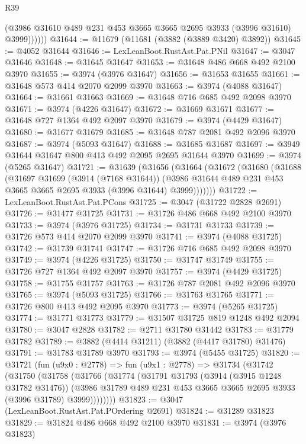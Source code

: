 \begin{lexlean}{R39}
\begin{coremodule}
              (@3986 @31610 @489 @231 @453 @3665 @3665 @2695 @3933 (@3996 @31610) @3999))))))
@31644 := @11679 (@11681 (@3882 (@3889 @3420) @3892))
@31645 := @4052 @31644
@31646 := LexLeanBoot.RustAst.Pat.PNil
@31647 := @3047 @31646
@31648 := @31645 @31647
@31653 := @31648 @486 @668 @492 @2100 @3970
@31655 := @3974 (@3976 @31647)
@31656 := @31653 @31655
@31661 := @31648 @573 @414 @2070 @2099 @3970
@31663 := @3974 (@4088 @31647)
@31664 := @31661 @31663
@31669 := @31648 @716 @685 @492 @2098 @3970
@31671 := @3974 (@4226 @31647)
@31672 := @31669 @31671
@31677 := @31648 @727 @1364 @492 @2097 @3970
@31679 := @3974 (@4429 @31647)
@31680 := @31677 @31679
@31685 := @31648 @787 @2081 @492 @2096 @3970
@31687 := @3974 (@5093 @31647)
@31688 := @31685 @31687
@31697 := @3949 @31644 @31647 @800 @413 @492 @2095 @2695 @31644 @3970
@31699 := @3974 (@5265 @31647)
@31721 := @31639
    (@31656
      (@31664
        (@31672
          (@31680
            (@31688
              (@31697
                @31699
                (@3914 (@7168 @31644))
                (@3986 @31644 @489 @231 @453 @3665 @3665 @2695 @3933 (@3996 @31644) @3999)))))))
@31722 := LexLeanBoot.RustAst.Pat.PCons
@31725 := @3047 (@31722 @2828 @2691)
@31726 := @31477 @31725
@31731 := @31726 @486 @668 @492 @2100 @3970
@31733 := @3974 (@3976 @31725)
@31734 := @31731 @31733
@31739 := @31726 @573 @414 @2070 @2099 @3970
@31741 := @3974 (@4088 @31725)
@31742 := @31739 @31741
@31747 := @31726 @716 @685 @492 @2098 @3970
@31749 := @3974 (@4226 @31725)
@31750 := @31747 @31749
@31755 := @31726 @727 @1364 @492 @2097 @3970
@31757 := @3974 (@4429 @31725)
@31758 := @31755 @31757
@31763 := @31726 @787 @2081 @492 @2096 @3970
@31765 := @3974 (@5093 @31725)
@31766 := @31763 @31765
@31771 := @31726 @800 @413 @492 @2095 @3970
@31773 := @3974 (@5265 @31725)
@31774 := @31771 @31773
@31779 := @31507 @31725 @819 @1248 @492 @2094
@31780 := @3047 @2828
@31782 := @2711 @31780 @31442
@31783 := @31779 @31782
@31789 := @3882 (@4414 @31211) (@3882 (@4417 @31780) @31476)
@31791 := @31783 @31789 @3970
@31793 := @3974 (@5455 @31725)
@31820 := @31721
    (fun (u9x0 : @2778) =>
    fun (u9x1 : @2778) =>
    @31734
      (@31742
        (@31750
          (@31758
            (@31766
              (@31774
                (@31791
                  @31793
                  (@3914 (@3915 @1248 @31782 @31476))
                  (@3986 @31789 @489 @231 @453 @3665 @3665 @2695 @3933 (@3996 @31789) @3999))))))))
@31823 := @3047 (LexLeanBoot.RustAst.Pat.POrdering @2691)
@31824 := @31289 @31823
@31829 := @31824 @486 @668 @492 @2100 @3970
@31831 := @3974 (@3976 @31823)

\end{coremodule}
\end{lexlean}
